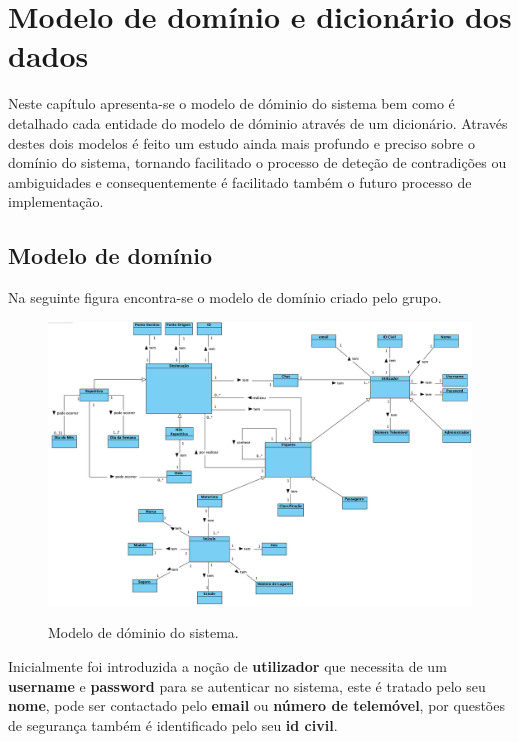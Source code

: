 \chapter{Modelo de domínio e dicionário dos dados}

\hspace{5mm} Neste capítulo apresenta-se o modelo de dóminio do sistema bem como é detalhado cada entidade do modelo de dóminio através de um dicionário. Através destes dois modelos é feito um estudo ainda mais profundo e preciso sobre o domínio do sistema, tornando facilitado o processo de deteção de contradições ou ambiguidades e consequentemente é facilitado também o futuro processo de implementação.

\newpage
\section{Modelo de domínio}

\hspace{5mm} Na seguinte figura encontra-se o modelo de domínio criado pelo grupo.

\begin{figure}[H]
    \centering
	\includegraphics[scale=0.5]{imagens/modelo-dominio.png}
	\label{img:duc1}
	\caption{Modelo de dóminio do sistema.}
\end{figure}

\hspace{5mm} Inicialmente foi introduzida a noção de \textbf{utilizador} que necessita de um \textbf{username} e \textbf{password} para se autenticar no sistema, este é tratado pelo seu \textbf{nome}, pode ser contactado pelo \textbf{email} ou \textbf{número de telemóvel}, por questões de segurança também é identificado pelo seu \textbf{id civil}. 

